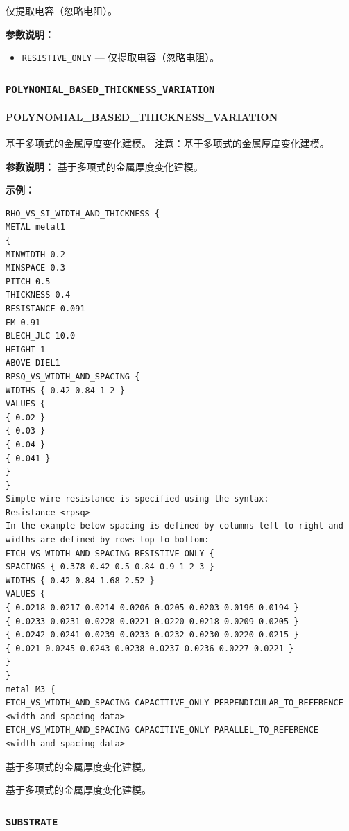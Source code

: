 仅提取电容（忽略电阻）。

\textbf{参数说明：}
\begin{itemize}
\item \texttt{RESISTIVE\_ONLY} — 仅提取电容（忽略电阻）。
\end{itemize}

\subsubsection{\texttt{POLYNOMIAL_BASED_THICKNESS_VARIATION}}
\paragraph*{POLYNOMIAL_BASED_THICKNESS_VARIATION}

基于多项式的金属厚度变化建模。 注意：基于多项式的金属厚度变化建模。

\textbf{参数说明：}
基于多项式的金属厚度变化建模。

\textbf{示例：}
\begin{lstlisting}
RHO_VS_SI_WIDTH_AND_THICKNESS {
METAL metal1
{
MINWIDTH 0.2
MINSPACE 0.3
PITCH 0.5
THICKNESS 0.4
RESISTANCE 0.091
EM 0.91
BLECH_JLC 10.0
HEIGHT 1
ABOVE DIEL1
RPSQ_VS_WIDTH_AND_SPACING {
WIDTHS { 0.42 0.84 1 2 }
VALUES {
{ 0.02 }
{ 0.03 }
{ 0.04 }
{ 0.041 }
}
}
Simple wire resistance is specified using the syntax:
Resistance <rpsq>
In the example below spacing is defined by columns left to right and
widths are defined by rows top to bottom:
ETCH_VS_WIDTH_AND_SPACING RESISTIVE_ONLY {
SPACINGS { 0.378 0.42 0.5 0.84 0.9 1 2 3 }
WIDTHS { 0.42 0.84 1.68 2.52 }
VALUES {
{ 0.0218 0.0217 0.0214 0.0206 0.0205 0.0203 0.0196 0.0194 }
{ 0.0233 0.0231 0.0228 0.0221 0.0220 0.0218 0.0209 0.0205 }
{ 0.0242 0.0241 0.0239 0.0233 0.0232 0.0230 0.0220 0.0215 }
{ 0.021 0.0245 0.0243 0.0238 0.0237 0.0236 0.0227 0.0221 }
}
}
metal M3 {
ETCH_VS_WIDTH_AND_SPACING CAPACITIVE_ONLY PERPENDICULAR_TO_REFERENCE
<width and spacing data>
ETCH_VS_WIDTH_AND_SPACING CAPACITIVE_ONLY PARALLEL_TO_REFERENCE
<width and spacing data>
\end{lstlisting}

\begin{noteBox}
基于多项式的金属厚度变化建模。
\end{noteBox}

\begin{noteBox}
基于多项式的金属厚度变化建模。
\end{noteBox}

\subsubsection{\texttt{SUBSTRATE}}

